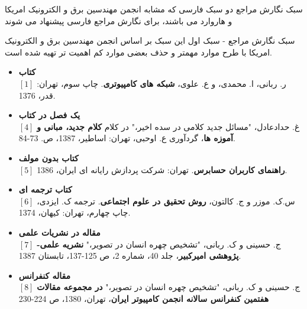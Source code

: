 \documentclass[14pt]{beamer}
\makeatletter
\newcommand{\rtlist}{\raggedleft\rightskip\@totalleftmargin}
\newcommand{\framefontsizelarge}{\fontsize{18pt}{0pt}\selectfont}
\newcommand{\frametitlefontsize}{\fontsize{20pt}{0pt}\selectfont}
\makeatother
\begin{document}
\begin{persian}
\begin{frame}[plain]{\frametitlefontsize  سبک نگارش مراجع}
		 دو سبک فارسی که مشابه انجمن مهندسین برق و الکترونیک امریکا و هاروارد می باشند، برای نگارش مراجع فارسی پیشنهاد می شوند
	\end{frame}	
	
	\begin{frame}[allowframebreaks]{\frametitlefontsize  سبک نگارش مراجع - سبک اول}
		\framefontsizelarge
		این سبک بر اساس انجمن مهندسین برق و الکترونیک امریکا با طرح موارد مهمتر و حذف بعضی موارد کم اهمیت تر تهیه شده است.
		
		\begin{itemize}\rtlist
			\item \textbf{کتاب} \\
			$[1]$ ر. ربانی، ا. محمدی، و ع. علوی، \textbf{شبکه های کامپیوتری}. چاپ سوم، تهران: قدر، 1376.
			\item \textbf{یک فصل در کتاب} \\
			$[4]$ غ. حدادعادل، "مسائل جدید کلامی در سده اخیر،" در کلام \textbf{کلام جدید، مبانی و آموزه ها}، گردآوری ع. اوحبی، تهران: اساطیر، 1387، ص. 73-84.
			\item \textbf{کتاب بدون مولف} \\
			$[5]$ \textbf{راهنمای کاربران حسابرس}. تهران: شرکت پردازش رایانه ای ایران، 1386.
			\item \textbf{کتاب ترجمه ای} \\
			$[6]$ س.ک. موزر و ج. کالتون، \textbf{روش تحقیق در علوم اجتماعی}. ترجمه ک. ایزدی، چاپ چهارم، تهران: کیهان، 1374.
			\item \textbf{مقاله در نشریات علمی} \\
			$[7]$ ج. حسینی و ک. ربانی، "تشخیص چهره انسان در تصویر،" \textbf{نشریه علمی-پژوهشی امیرکبیر}، جلد 40، شماره 2، ص 125-137، تابستان 1387.
			\item \textbf{مقاله کنفرانس} \\
			$[8]$ ج. حسینی و ک. ربانی، "تشخیص چهره انسان در تصویر،" \textbf{در مجموعه مقالات هفتمین کنفرانس سالانه انجمن کامپیوتر ایران}، تهران، 1380، ص 224-230
			
		\end{itemize}
	\end{frame}	

\end{persian}
\end{document}
